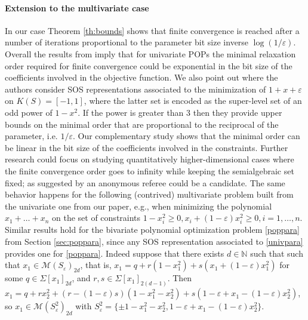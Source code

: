 \documentclass[a4paper,12pt]{article}
\newcommand{\N}{\mathbb{N}} %
\newcommand{\cM}{\mathcal{M}} %
\begin{document}
\paragraph{{Extension to the multivariate case}}
In our case Theorem \ref{th:bounds} shows that finite convergence is reached  
after a number of iterations proportional to the parameter bit size inverse $\log(1/\varepsilon)$. 
Overall the results from {\cite{st96}} imply that for univariate POPs the minimal relaxation order required for finite convergence could be exponential in the bit size of the coefficients involved in the objective function. {We also point out \cite[Theorem~7]{pow00} where the authors consider SOS representations associated to the minimization of $1+x+\varepsilon$ on $K(S)=[-1, 1]$, where the latter set is encoded as the super-level set of an odd power of $1 -x^2$. 
If the power is greater than 3 then they provide upper bounds on the minimal order that are proportional to the reciprocal of the parameter, i.e. $1/\varepsilon$.}
Our complementary study shows that the minimal order can be linear in the bit size of the coefficients involved in the constraints. 
{
Further research could focus on studying quantitatively higher-dimensional cases where the finite convergence order goes to infinity while keeping the semialgebraic set fixed; as suggested by an anonymous referee  \cite[Example 3.7]{netzer10} could be a candidate. 
}
{
The same behavior happens for the following (contrived) multivariate problem built from the univariate one from our paper, e.g., when minimizing the polynomial $x_1 + \dots + x_n$ on the set of constraints $1 - x_i^2 \geq 0, x_i + (1-\varepsilon) x_i^2 \geq 0, i=1,\dots,n$. 
Similar results hold for the bivariate polynomial optimization problem \eqref{poppara} from Section \ref{sec:poppara}, since any SOS representation associated to \eqref{univpara} provides one for \eqref{poppara}. 
Indeed suppose that there exists $d \in \N$ such that such that $x_1  \in \cM(S_{\varepsilon})_{2d}$, that is, $x_1  = q + r (1-x_1^2) + s(x_1 + (1 - \varepsilon) x_1^2)$ for some $q \in \Sigma[x_1]_{2 d}$, and $r,s \in \Sigma[x_1]_{2(d-1)}$. 
Then $x_1  = q + r x_2^2 + (r - (1 - \varepsilon)s) (1 - x_1^2 - x_2^2) + s (1 - \varepsilon + x_1 - (1-\varepsilon) x_2^2)$, so $x_1  \in \cM(S^2_{\varepsilon})_{2d}$ with $S^2_{\varepsilon} = \{\pm 1-x_1^2-x_2^2,  1 - \varepsilon + x_1 - (1-\varepsilon) x_2^2\}$. 
}
\end{document}
